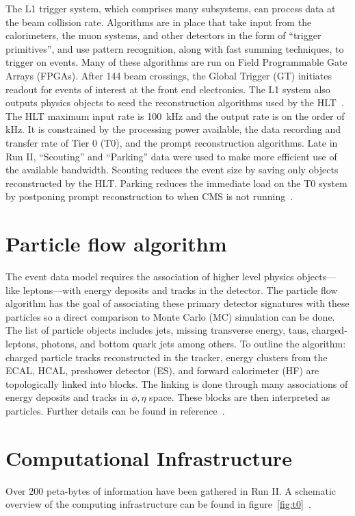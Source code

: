 The L1 trigger system, which comprises many subsystems, can process data at the beam collision rate. Algorithms are in place that take input from the calorimeters, the muon systems, and other detectors in the form of ``trigger primitives'', and use pattern recognition, along with fast summing techniques, to trigger on events. Many of these algorithms are run on Field Programmable Gate Arrays (FPGAs). 
After 144 beam crossings, the Global Trigger (GT) initiates readout for events of interest at the front end electronics. 
 The L1 system also outputs physics objects to seed the reconstruction algorithms used by the HLT~\cite{Foudas:2232067}. 
The HLT maximum input rate is 100~kHz and the output rate is on the order of kHz. It is constrained by the processing power available, the data recording and transfer rate of Tier 0 (T0), and the prompt reconstruction algorithms. Late in Run II,  ``Scouting'' and ``Parking'' data were used to make more efficient use of the available bandwidth. Scouting reduces the event size by saving only objects reconstructed by the HLT. Parking reduces the immediate load on the T0 system by postponing prompt reconstruction to when CMS is not running~\cite{Thomas:2703017}.


\section{Particle flow algorithm}
The event data model requires the association of higher level physics objects---like leptons---with energy deposits and tracks in the detector. 
The particle flow algorithm has the goal of associating these primary detector signatures with these particles so a direct comparison to Monte Carlo (MC) simulation can be done. 
The list of particle objects includes jets, missing transverse energy, taus, charged-leptons, photons, and bottom quark jets among others.
To outline the algorithm: charged particle tracks reconstructed in the tracker, energy clusters from the ECAL, HCAL, preshower detector (ES), and forward calorimeter (HF) are topologically linked into blocks. The linking is done through many associations of energy deposits and tracks in $\phi,\eta$ space. These blocks are then interpreted as particles. Further details can be found in reference~\cite{CMS-PAS-PFT-10-001}.

\section{Computational Infrastructure}
Over 200 peta-bytes of information have been gathered in Run II. A schematic overview of the computing infrastructure can be found in figure~\ref{fig:t0}~\cite{Hufnagel:1319049}.

